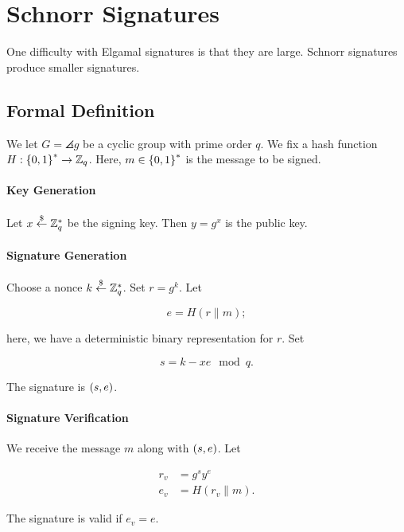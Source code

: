 \section{Schnorr Signatures}
\label{sec:signatures_schnorr}

One difficulty with Elgamal signatures is that they are large.
Schnorr signatures produce smaller signatures.

\subsection{Formal Definition}

\begin{defn}
We let $G = \angles{g}$ be a \gls{cyclic group} with prime order $q$.
We fix a \gls{hash function} $H:\left\{ 0,1 \right\}^{*}\to\mathbb{Z}_{q}$.
Here, $m\in\left\{ 0,1 \right\}^{*}$ is the message to be signed.

\paragraph{Key Generation}
Let $x\stackrel{\$}{\leftarrow}{}\mathbb{Z}_{q}^{*}$ be the signing key.
Then $y = g^{x}$ is the public key.

\paragraph{Signature Generation}
Choose a \gls{nonce} $k\stackrel{\$}{\leftarrow}{}\mathbb{Z}_{q}^{*}$.
Set $r = g^{k}$.
Let

\begin{equation}
    e = H(r\|m);
\end{equation}

\noindent
here, we have a deterministic binary representation for $r$.
Set

\begin{equation}
    s = k - xe \mod q.
\end{equation}

\noindent
The signature is $\left( s,e \right)$.

\paragraph{Signature Verification}
We receive the message $m$ along with $\left( s,e \right)$.
Let

\begin{align}
    r_{v} &= g^{s}y^{e}
        \nonumber\\
    e_{v} &= H(r_{v}\|m).
\end{align}

\noindent
The signature is valid if $e_{v} = e$.
\end{defn}

